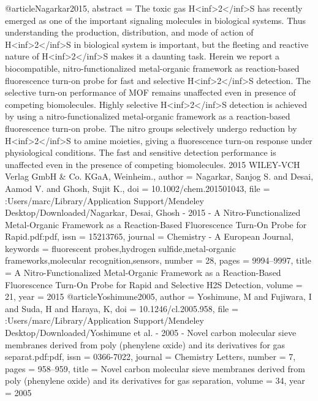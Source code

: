 @article{Nagarkar2015,
abstract = {The toxic gas H{\textless}inf{\textgreater}2{\textless}/inf{\textgreater}S has recently emerged as one of the important signaling molecules in biological systems. Thus understanding the production, distribution, and mode of action of H{\textless}inf{\textgreater}2{\textless}/inf{\textgreater}S in biological system is important, but the fleeting and reactive nature of H{\textless}inf{\textgreater}2{\textless}/inf{\textgreater}S makes it a daunting task. Herein we report a biocompatible, nitro-functionalized metal-organic framework as reaction-based fluorescence turn-on probe for fast and selective H{\textless}inf{\textgreater}2{\textless}/inf{\textgreater}S detection. The selective turn-on performance of MOF remains unaffected even in presence of competing biomolecules. Highly selective H{\textless}inf{\textgreater}2{\textless}/inf{\textgreater}S detection is achieved by using a nitro-functionalized metal-organic framework as a reaction-based fluorescence turn-on probe. The nitro groups selectively undergo reduction by H{\textless}inf{\textgreater}2{\textless}/inf{\textgreater}S to amine moieties, giving a fluorescence turn-on response under physiological conditions. The fast and sensitive detection performance is unaffected even in the presence of competing biomolecules. {\textcopyright} 2015 WILEY-VCH Verlag GmbH {\&} Co. KGaA, Weinheim.},
author = {Nagarkar, Sanjog S. and Desai, Aamod V. and Ghosh, Sujit K.},
doi = {10.1002/chem.201501043},
file = {:Users/marc/Library/Application Support/Mendeley Desktop/Downloaded/Nagarkar, Desai, Ghosh - 2015 - A Nitro-Functionalized Metal-Organic Framework as a Reaction-Based Fluorescence Turn-On Probe for Rapid.pdf:pdf},
issn = {15213765},
journal = {Chemistry - A European Journal},
keywords = {fluorescent probes,hydrogen sulfide,metal-organic frameworks,molecular recognition,sensors},
number = {28},
pages = {9994--9997},
title = {{A Nitro-Functionalized Metal-Organic Framework as a Reaction-Based Fluorescence Turn-On Probe for Rapid and Selective H2S Detection}},
volume = {21},
year = {2015}
}
@article{Yoshimune2005,
author = {Yoshimune, M and Fujiwara, I and Suda, H and Haraya, K},
doi = {10.1246/cl.2005.958},
file = {:Users/marc/Library/Application Support/Mendeley Desktop/Downloaded/Yoshimune et al. - 2005 - Novel carbon molecular sieve membranes derived from poly (phenylene oxide) and its derivatives for gas separat.pdf:pdf},
issn = {0366-7022},
journal = {Chemistry Letters},
number = {7},
pages = {958--959},
title = {{Novel carbon molecular sieve membranes derived from poly (phenylene oxide) and its derivatives for gas separation}},
volume = {34},
year = {2005}
}

